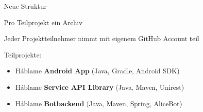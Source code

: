 \begin{frame}
Neue Struktur
\begin{block}{}
	Pro Teilprojekt	ein Archiv
\end{block}
\begin{block}{}
	Jeder Projektteilnehmer nimmt mit eigenem GitHub Account teil
\end{block}
\begin{block}{}
	Teilprojekte:
	\begin{itemize}\itemsep0pt
		\item Háblame \textbf{Android App} (Java, Gradle, Android SDK)
		\item Háblame \textbf{Service API Library} (Java, Maven, Unirest)
		\item Háblame \textbf{Botbackend} (Java, Maven, Spring, AliceBot)
	\end{itemize}
\end{block}
\end{frame}